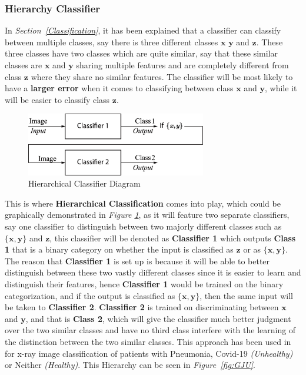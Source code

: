 \documentclass[12pt]{extarticle}
\begin{document}
	\subsubsection{Hierarchy Classifier}\label{Hierarchy_Class}
	In \emph{Section~\ref{Classification}}, it has been explained that a classifier can classify between multiple classes, say there is three different classes $\bm{x}$ $\bm{y}$ and $\bm{z}$. These three classes have two classes which are quite similar, say that these similar classes are $\bm{x}$ and $\bm{y}$ sharing multiple features and are completely different from class $\bm{z}$ where they share no similar features. The classifier will be most likely to have a \textbf{larger error} when it comes to classifying between class $\bm{x}$ and $\bm{y}$, while it will be easier to classify class $\bm{z}$.\\[5mm]
	\begin{figure}[h]
		\centering
		\includegraphics[width=0.7\textwidth]{pics/Figures/Hierarchical_Classifier_Block_Diagram.eps}
		\caption{\small{Hierarchical Classifier Diagram}}
		\label{fig:Hierarchical Classifier}
	\end{figure}
	This is where \textbf{Hierarchical Classification} comes into play, which could be graphically demonstrated in \emph{Figure \ref{fig:Hierarchical Classifier}}, as it will feature two separate classifiers, say one classifier to distinguish between two majorly different classes such as $\bm{\{x,y\}}$ and $\bm{z}$, this classifier will be denoted as \textbf{Classifier 1} which outputs \textbf{Class 1} that is a binary category on whether the input is classified as $\bm{z}$ or as $\bm{\{x,y\}}$. The reason that \textbf{Classifier 1} is set up is because it will be able to better distinguish between these two vastly different classes since it is easier to learn and distinguish their features, hence \textbf{Classifier 1} would be trained on the binary categorization, and if the output is classified as $\bm{\{x,y\}}$, then the same input will be taken to \textbf{Classifier 2}. \textbf{Classifier 2} is trained on discriminating between $\bm{x}$ and $\bm{y}$, and that is \textbf{Class 2}, which will give the classifier much better judgment over the two similar classes and have no third class interfere with the learning of the distinction between the two similar classes. This approach has been used in \cite{GJU} for x-ray image classification of patients with Pneumonia, Covid-19 \emph{(Unhealthy)} or Neither \emph{(Healthy)}. This Hierarchy can be seen in \emph{Figure~\ref{fig:GJU}}.
\end{document}
